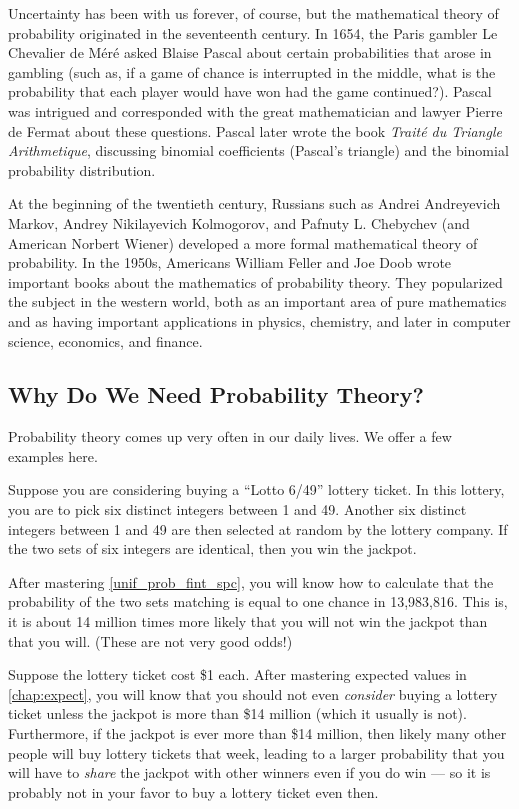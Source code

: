 Uncertainty has been with us forever, of course, but the mathematical theory of probability originated in the
seventeenth century. In 1654, the Paris gambler Le Chevalier de M\'er\'e asked Blaise Pascal about certain
probabilities that arose in gambling (such as, if a game of chance is interrupted in the middle, what is the
probability that each player would have won had the game continued?). Pascal was intrigued and corresponded with the
great mathematician and lawyer Pierre de Fermat about these questions. Pascal later wrote the book \emph{Trait\'e du
Triangle Arithmetique}, discussing binomial coefficients (Pascal's triangle) and the binomial probability
distribution.

At the beginning of the twentieth century, Russians such as Andrei Andreyevich Markov, Andrey Nikilayevich
Kolmogorov, and Pafnuty L. Chebychev (and American Norbert Wiener) developed a more formal mathematical theory of
probability. In the 1950s, Americans William Feller and Joe Doob wrote important books about the mathematics of
probability theory. They popularized the subject in the western world, both as an important area of pure mathematics
and as having important applications in physics, chemistry, and later in computer science, economics, and finance.

\subsection{Why Do We Need Probability Theory?}
Probability theory comes up very often in our daily lives. We offer a few examples here.

Suppose you are considering buying a ``Lotto 6/49'' lottery ticket. In this lottery, you are to pick six distinct
integers between 1 and 49. Another six distinct integers between 1 and 49 are then selected at random by the lottery
company. If the two sets of six integers are identical, then you win the jackpot.

After mastering \autoref{unif_prob_fint_spc}, you will know how to calculate that the probability of the two sets
matching is equal to one chance in 13,983,816. This is, it is about 14 million times more likely that you will not
win the jackpot than that you will. (These are not very good odds!)

Suppose the lottery ticket cost \$1 each. After mastering expected values in \autoref{chap:expect}, you will know
that you should not even \emph{consider} buying a lottery ticket unless the jackpot is more than \$14 million (which
it usually is not). Furthermore, if the jackpot is ever more than \$14 million, then likely many other people will
buy lottery tickets that week, leading to a larger probability that you will have to \emph{share} the jackpot with
other winners even if you do win --- so it is probably not in your favor to buy a lottery ticket even then.

